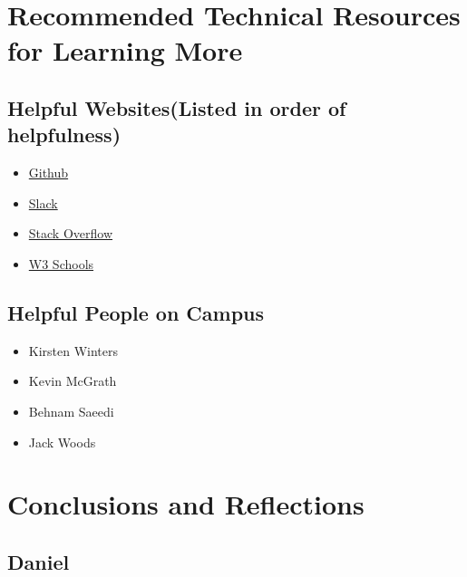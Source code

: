 \documentclass[journal,10pt,onecolumn,compsoc]{IEEEtran}
\begin{document}
    \section{Recommended Technical Resources for Learning More}
    \subsection{Helpful Websites(Listed in order of helpfulness)}
	\begin{itemize}
    \item \href{https://github.com/}{Github}
    \item \href{https://slack.com/}{Slack}
    \item \href{https://stackoverflow.com/}{Stack Overflow}
	\item \href{https://www.w3schools.com/}{W3 Schools}
    \end{itemize}
    \subsection{Helpful People on Campus}
	\begin{itemize}
    \item Kirsten Winters
    \item Kevin McGrath
	\item Behnam Saeedi
    \item Jack Woods
    \end{itemize}
    \section{Conclusions and Reflections}
    \subsection{Daniel}
\end{document}
